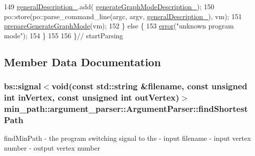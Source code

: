 \begin{DoxyCode}
149                 \hyperlink{a00002_a1fa87430e08e605b208fd532e73ac236_a1fa87430e08e605b208fd532e73ac236}{generalDescription\_}.add(
      \hyperlink{a00002_aaa15954a88f93131e4c17223eafc11c5_aaa15954a88f93131e4c17223eafc11c5}{generateGraphModeDescription\_});
150                 po::store(po::parse\_command\_line(argc, argv, \hyperlink{a00002_a1fa87430e08e605b208fd532e73ac236_a1fa87430e08e605b208fd532e73ac236}{generalDescription\_}), vm);
151                 \hyperlink{a00002_af2d4ef90c6ccee55da52f5a5a1c69693_af2d4ef90c6ccee55da52f5a5a1c69693}{prepareGenerateGraphMode}(vm);
152             \} \textcolor{keywordflow}{else} \{
153                 \hyperlink{a00002_a87a2f3f5782023b4ed03aedc00094c01_a87a2f3f5782023b4ed03aedc00094c01}{error}(\textcolor{stringliteral}{"unknown program mode"});
154             \}
155 
156         \}\textcolor{comment}{// startParsing}
\end{DoxyCode}


\subsection{Member Data Documentation}
\subsubsection[{\texorpdfstring{find\+Shortest\+Path}{findShortestPath}}]{\setlength{\rightskip}{0pt plus 5cm}bs\+::signal$<$void(const std\+::string \&filename, const unsigned int in\+Vertex, const unsigned int out\+Vertex)$>$ min\+\_\+path\+::argument\+\_\+parser\+::\+Argument\+Parser\+::find\+Shortest\+Path}\hypertarget{a00002_a7eb42d6b80eabc27953b1e2ddb08f7f1_a7eb42d6b80eabc27953b1e2ddb08f7f1}{}\label{a00002_a7eb42d6b80eabc27953b1e2ddb08f7f1_a7eb42d6b80eabc27953b1e2ddb08f7f1}


find\+Min\+Path -\/ the program switching signal to the   -\/ input filename  -\/ input vertex number  -\/ output vertex number 

